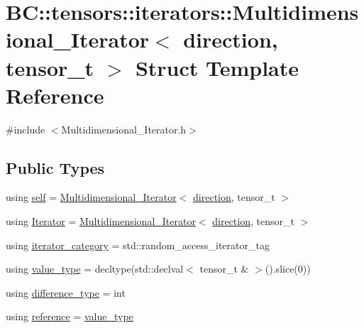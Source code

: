 \hypertarget{structBC_1_1tensors_1_1iterators_1_1Multidimensional__Iterator}{}\section{BC\+:\+:tensors\+:\+:iterators\+:\+:Multidimensional\+\_\+\+Iterator$<$ direction, tensor\+\_\+t $>$ Struct Template Reference}
\label{structBC_1_1tensors_1_1iterators_1_1Multidimensional__Iterator}


{\ttfamily \#include $<$Multidimensional\+\_\+\+Iterator.\+h$>$}

\subsection*{Public Types}
\begin{DoxyCompactItemize}
\item 
using \hyperlink{structBC_1_1tensors_1_1iterators_1_1Multidimensional__Iterator_a6370d6c3ef166ac92fd31f4718f17536}{self} = \hyperlink{structBC_1_1tensors_1_1iterators_1_1Multidimensional__Iterator}{Multidimensional\+\_\+\+Iterator}$<$ \hyperlink{namespaceBC_1_1tensors_1_1iterators_adbaa579cf4202e9bf262b436879f0f91}{direction}, tensor\+\_\+t $>$
\item 
using \hyperlink{structBC_1_1tensors_1_1iterators_1_1Multidimensional__Iterator_a4b21637f176748500fff232ca13fe2bb}{Iterator} = \hyperlink{structBC_1_1tensors_1_1iterators_1_1Multidimensional__Iterator}{Multidimensional\+\_\+\+Iterator}$<$ \hyperlink{namespaceBC_1_1tensors_1_1iterators_adbaa579cf4202e9bf262b436879f0f91}{direction}, tensor\+\_\+t $>$
\item 
using \hyperlink{structBC_1_1tensors_1_1iterators_1_1Multidimensional__Iterator_af1894bf9eea6a7a889a347392c2c2fd1}{iterator\+\_\+category} = std\+::random\+\_\+access\+\_\+iterator\+\_\+tag
\item 
using \hyperlink{structBC_1_1tensors_1_1iterators_1_1Multidimensional__Iterator_ab876f005ae32c434ca78921214a3ecec}{value\+\_\+type} = decltype(std\+::declval$<$ tensor\+\_\+t \& $>$().slice(0))
\item 
using \hyperlink{structBC_1_1tensors_1_1iterators_1_1Multidimensional__Iterator_ad5a1d1036eaf2d644e1e3e62ed30ceae}{difference\+\_\+type} = int
\item 
using \hyperlink{structBC_1_1tensors_1_1iterators_1_1Multidimensional__Iterator_a7273dce25bbc3709f40b187bafd73832}{reference} = \hyperlink{structBC_1_1tensors_1_1iterators_1_1Multidimensional__Iterator_ab876f005ae32c434ca78921214a3ecec}{value\+\_\+type}
\end{DoxyCompactItemize}
